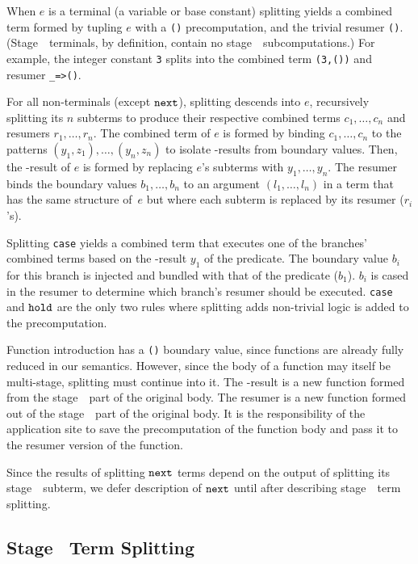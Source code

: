 \begin{abstrsyn}
When $e$ is a terminal (a variable or base constant)
splitting yields a combined term formed by tupling $e$ with a \texttt{()} precomputation, and the trivial resumer \texttt{()}. (Stage~\bbone\ terminals, by definition, contain no stage~\bbtwo\ subcomputations.)  For example, the integer constant \texttt{3} splits into the combined term \texttt{(3,())} and resumer \texttt{\_=>()}.

For all non-terminals (except ${\tt next}$),
splitting descends into $e$, recursively splitting its $n$ subterms
to produce their respective combined terms $c_1,\ldots,c_n$ and resumers $r_1, \ldots, r_n$.
The combined term of $e$ is formed by binding $c_1,\ldots,c_n$
to the patterns $(y_1,z_1),\ldots,(y_n,z_n)$
to isolate \bbone-results from boundary values. Then,
the \bbone-result of $e$ is formed by replacing $e$'s subterms with $y_1,\ldots,y_n$.
The resumer binds the boundary values $b_1,\ldots,b_n$ to an
argument $(l_1,\ldots,l_n)$ in a term that has the same structure
of~$e$ but where each subterm is replaced by its resumer ($r_i$'s).

Splitting {\tt case} yields a combined term that executes one of the branches' combined terms based on the \bbone-result $y_1$ of the predicate.
The boundary value $b_i$ for this branch is injected and bundled with that of the predicate ($b_1$).   
$b_i$ is cased in the resumer to determine which branch's resumer should be executed.
{\tt case} and ${\tt hold}$ are the only two rules where splitting adds non-trivial logic is added to the precomputation.

Function introduction has a \texttt{()} boundary value,
since functions are already fully reduced in our semantics.
However, since the body of a function may itself be multi-stage, splitting must continue into it.
The \bbone-result is a new function formed from the stage~\bbone\ part of the original body.
The resumer is a new function formed out of the stage~\bbtwo\ part of the original body.
It is the responsibility of the application site to save the precomputation of the function body
and pass it to the resumer version of the function.

Since the results of splitting ${\tt next}$ terms depend on the output of splitting its stage~\bbtwo\ subterm,
we defer description of ${\tt next}$ until after describing stage~\bbtwo\ term splitting.

\subsection{Stage \bbtwo\ Term Splitting}


\end{abstrsyn}
